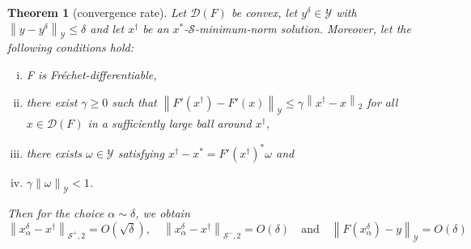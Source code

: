 \documentclass[11pt]{article}
\newtheorem{theorem}{Theorem}[section]
\begin{document}
\begin{theorem}[convergence rate]\label{thm54}
Let $\mathcal{D}(F)$ be convex, let $ y^\delta\in \mathcal{Y} $ with $ \left\|y-y^\delta\right\|_\mathcal{Y}\leq\delta $ and let $ x^\dagger $ be an $ x^* $-$\mathcal{S}$-minimum-norm solution. Moreover, let the following conditions hold:
\begin{enumerate}[(i)]
\item F is Fr\'{e}chet-differentiable,
\item there exist $ \gamma\geq 0 $ such that $ \left\|F'(x^\dag) - F'(x)\right\|_\mathcal{Y} \leq \gamma\left\|x^\dagger - x\right\|_2 $ for all $ x\in\mathcal{D}(F) $ in a sufficiently large ball around $ x^\dagger $,
\item there exists $ \omega\in \mathcal{Y} $ satisfying $ x^\dagger - x^* = F'(x^\dagger)^*\omega $ and
\item  $\gamma\left\|\omega\right\|_\mathcal{Y}<1$.
\end{enumerate}
Then for the choice $ \alpha\sim\delta $, we obtain
\begin{displaymath}
\left\|x_\alpha^\delta - x^\dagger\right\|_{\mathcal{S}^+, 2} = O(\sqrt{\delta}),\quad \left\|x_\alpha^\delta - x^\dagger\right\|_{\mathcal{S}^-, 2} = O(\delta)\quad \mathrm{and} \quad \left\|F(x_\alpha^\delta) - y\right\|_\mathcal{Y} = O(\delta)
\end{displaymath}
\end{theorem}
\end{document}
